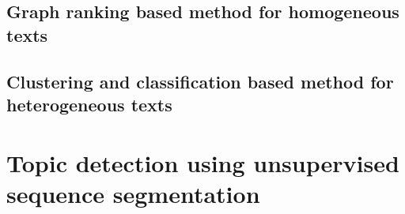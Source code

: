 \documentclass[11pt]{article}
\begin{document}
\subsection{Graph ranking based method for homogeneous texts}




\subsection{Clustering and classification based method for heterogeneous texts}



\section{Topic detection using unsupervised sequence segmentation}




\end{document}
